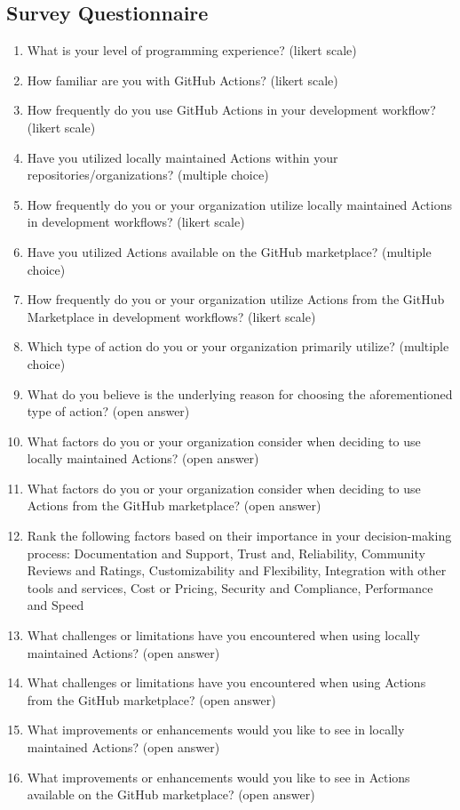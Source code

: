 \documentclass[conference]{IEEEtran}
\begin{document}
\subsection{Survey Questionnaire}
\begin{enumerate}
    \item What is your level of programming experience? (likert scale)
    \item How familiar are you with GitHub Actions? (likert scale)
    \item How frequently do you use GitHub Actions in your development workflow? (likert scale)
    \item Have you utilized locally maintained Actions within your repositories/organizations? (multiple choice)
    \item How frequently do you or your organization utilize locally maintained Actions in development workflows? (likert scale)
    \item Have you utilized Actions available on the GitHub marketplace? (multiple choice)
    \item How frequently do you or your organization utilize Actions from the GitHub Marketplace in development workflows? (likert scale)
    \item Which type of action do you or your organization primarily utilize? (multiple choice)
    \item What do you believe is the underlying reason for choosing the aforementioned type of action? (open answer)
    \item What factors do you or your organization consider when deciding to use locally maintained Actions? (open answer)
    \item What factors do you or your organization consider when deciding to use Actions from the GitHub marketplace? (open answer)
    \item Rank the following factors based on their importance in your decision-making process: Documentation and Support, Trust and, Reliability, Community Reviews and Ratings, Customizability and Flexibility, Integration with other tools and services, Cost or Pricing, Security and Compliance, Performance and Speed
    \item What challenges or limitations have you encountered when using locally maintained Actions? (open answer)
    \item What challenges or limitations have you encountered when using Actions from the GitHub marketplace? (open answer)
    \item What improvements or enhancements would you like to see in locally maintained Actions? (open answer)
    \item What improvements or enhancements would you like to see in Actions available on the GitHub marketplace? (open answer)
\end{enumerate} 




\vspace{12pt}
\end{document}
